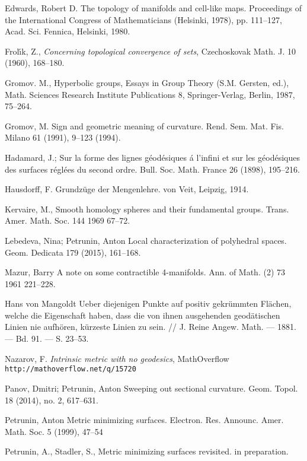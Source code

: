 \begin{thebibliography}{52}
 Edwards, Robert D. The topology of manifolds and cell-like maps. Proceedings of the International Congress of Mathematicians (Helsinki, 1978), pp. 111--127, Acad. Sci. Fennica, Helsinki, 1980.

 Frol\'{\i}k, Z., \textit{Concerning topological convergence of sets}, Czechoskovak Math. J. 10 (1960), 168--180.

Gromov. M.,
Hyperbolic groups, 
Essays in Group Theory (S.M. Gersten, ed.),
Math. Sciences Research Institute Publications 8,
Springer-Verlag, Berlin,
1987, 75--264.

Gromov, M.
Sign and geometric meaning of curvature. 
Rend. Sem. Mat. Fis. Milano 61 (1991), 9--123 (1994).

 Hadamard, J.;
Sur la forme des lignes g\'eod\'esiques \'a l'infini et sur les g\'eod\'esiques des surfaces r\'egl\'ees du second ordre.
Bull. Soc. Math. France 26 (1898), 195--216.

Hausdorff, F. 
Grundz\"uge der Mengenlehre.
von Veit, 
Leipzig, 
1914.

 Kervaire, M., 
Smooth homology spheres and their fundamental groups.
Trans. Amer. Math. Soc. 144 1969 67--72.

 Lebedeva, Nina; Petrunin, Anton Local characterization of polyhedral spaces. Geom. Dedicata 179 (2015), 161--168.

Mazur, Barry A note on some contractible 4-manifolds. Ann. of Math. (2) 73 1961 221--228.

Hans von Mangoldt Ueber diejenigen Punkte auf positiv gekr\"ummten Fl\"achen, welche die Eigenschaft haben, dass die von ihnen ausgehenden geod\"atischen Linien nie aufh\"oren, k\"urzeste Linien zu sein. // J. Reine Angew. Math. --- 1881. --- Bd. 91. --- S. 23--53.

Nazarov, F.
\textit{Intrinsic metric with no geodesics},
MathOverflow \texttt{http://mathoverflow.net/q/15720}

Panov, Dmitri; Petrunin, Anton
Sweeping out sectional curvature. 
Geom. Topol. 18 (2014), no. 2, 617--631. 

 Petrunin, Anton
Metric minimizing surfaces. 
Electron. Res. Announc. Amer. Math. Soc. 5 (1999), 47--54

  Petrunin, A., Stadler, S., 
Metric minimizing surfaces revisited. in preparation.


\end{thebibliography}
